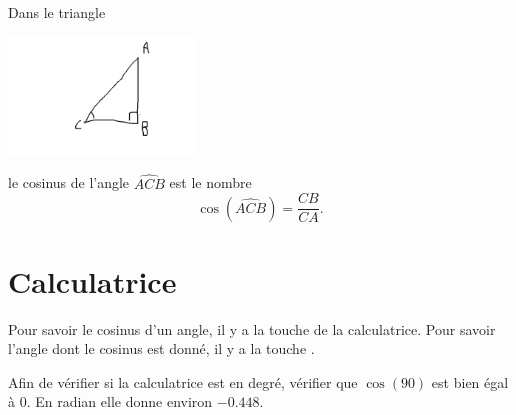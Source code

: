 \begin{example}
    Dans le triangle
    \begin{center}
        \includegraphics[width=5cm]{faux_ex_adj.pdf}
    \end{center}
    le cosinus de l'angle \( \widehat{ACB}\) est le nombre
    \begin{equation}
        \cos(\widehat{ACB})=\frac{ CB }{ CA }.
    \end{equation}
\end{example}





\section{Calculatrice}

\begin{Aretenir}
    Pour savoir le cosinus d'un angle, il y a la touche  de la calculatrice. Pour savoir l'angle dont le cosinus est donné, il y a la touche .
\end{Aretenir}

Afin de vérifier si la calculatrice est en degré, vérifier que \( \cos(90)\) est bien égal à \( 0\). En radian elle donne environ \( -0.448\).


